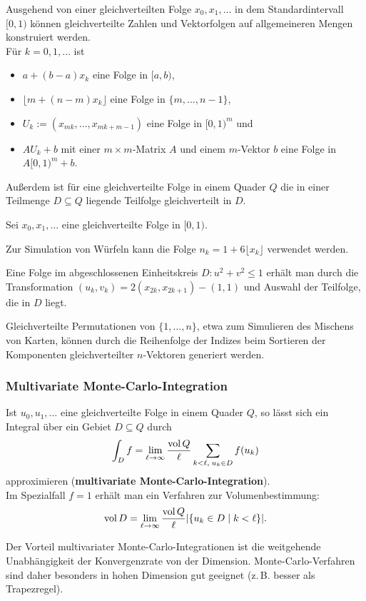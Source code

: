 Ausgehend von einer gleichverteilten Folge $x_0, x_1, \dotsc$ in dem
Standardintervall $[0, 1)$ können gleichverteilte Zahlen und Vektorfolgen
auf allgemeineren Mengen konstruiert werden. \\
Für $k = 0, 1, \dotsc$ ist
\begin{itemize}
    \item
    $a + (b - a)x_k$ eine Folge in $[a, b)$,

    \item
    $\lfloor m + (n - m)x_k \rfloor$ eine Folge in $\{m, \dotsc, n - 1\}$,

    \item
    $U_k := (x_{mk}, \dotsc, x_{mk + m - 1})$ eine Folge in $[0, 1)^m$ und

    \item
    $A U_k + b$ mit einer $m \times m$-Matrix $A$ und einem $m$-Vektor $b$
    eine Folge in $A[0,1)^m + b$.
\end{itemize}
Außerdem ist für eine gleichverteilte Folge in einem Quader $Q$ die in einer
Teilmenge $D \subseteq Q$ liegende Teilfolge gleichverteilt in $D$.

\linie

Sei $x_0, x_1, \dotsc$ eine gleichverteilte Folge in $[0, 1)$.

Zur Simulation von Würfeln kann die Folge
$n_k = 1 + 6 \lfloor x_k \rfloor$ verwendet werden.

Eine Folge im abgeschlossenen Einheitskreis $D\colon u^2 + v^2 \le 1$
erhält man durch die Transformation $(u_k, v_k) = 2(x_{2k}, x_{2k+1}) - (1, 1)$
und Auswahl der Teilfolge, die in $D$ liegt.

Gleichverteilte Permutationen von $\{1, \dotsc, n\}$, etwa zum Simulieren
des Mischens von Karten, können durch die Reihenfolge der Indizes beim
Sortieren der Komponenten gleichverteilter $n$-Vektoren generiert werden.

\subsubsection{%
    Multivariate Monte-Carlo-Integration%
}

Ist $u_0, u_1, \dotsc$ eine gleichverteilte Folge in einem Quader $Q$, so lässt
sich ein Integral über ein Gebiet $D \subseteq Q$ durch
\begin{align*}
    \int_D f = \lim_{\ell \to \infty} \frac{\operatorname{vol} Q}{\ell}
    \sum_{k < \ell,\; u_k \in D} f(u_k)
\end{align*}
approximieren (\textbf{multivariate Monte-Carlo-Integration}). \\
Im Spezialfall $f = 1$ erhält man ein Verfahren zur Volumenbestimmung:
\begin{align*}
    \operatorname{vol} D = \lim_{\ell \to \infty} \frac{\operatorname{vol} Q}{\ell}
    |\{u_k \in D \;|\; k < \ell\}|.
\end{align*}

\linie

Der Vorteil multivariater Monte-Carlo-Integrationen ist die weitgehende
Unabhängigkeit der Konvergenzrate von der Dimension.
Monte-Carlo-Verfahren sind daher besonders in hohen Dimension gut geeignet
(z.\,B. besser als Trapezregel).

\pagebreak
